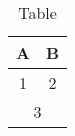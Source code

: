 \begin{table}[h]
    \caption{Table}
    \label{tab: table}
    \begin{tabular}{c c}
    A & B \tabularnewline
    \toprule
    1 & 2\\
    \multicolumn{2}{c}{3}\\
    \end{tabular}
\end{table}
